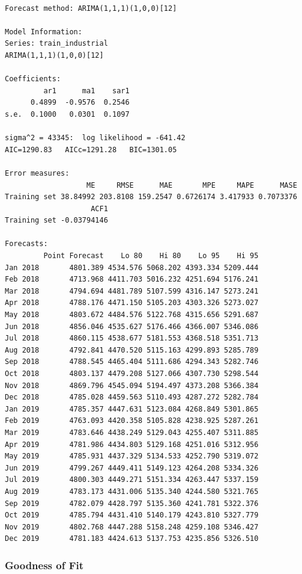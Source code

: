 \documentclass[
  letterpaper,
  DIV=11,
  numbers=noendperiod]{scrartcl}
\begin{document}
\begin{verbatim}

Forecast method: ARIMA(1,1,1)(1,0,0)[12]

Model Information:
Series: train_industrial 
ARIMA(1,1,1)(1,0,0)[12] 

Coefficients:
         ar1      ma1    sar1
      0.4899  -0.9576  0.2546
s.e.  0.1000   0.0301  0.1097

sigma^2 = 43345:  log likelihood = -641.42
AIC=1290.83   AICc=1291.28   BIC=1301.05

Error measures:
                   ME     RMSE      MAE       MPE     MAPE      MASE
Training set 38.84992 203.8108 159.2547 0.6726174 3.417933 0.7073376
                    ACF1
Training set -0.03794146

Forecasts:
         Point Forecast    Lo 80    Hi 80    Lo 95    Hi 95
Jan 2018       4801.389 4534.576 5068.202 4393.334 5209.444
Feb 2018       4713.968 4411.703 5016.232 4251.694 5176.241
Mar 2018       4794.694 4481.789 5107.599 4316.147 5273.241
Apr 2018       4788.176 4471.150 5105.203 4303.326 5273.027
May 2018       4803.672 4484.576 5122.768 4315.656 5291.687
Jun 2018       4856.046 4535.627 5176.466 4366.007 5346.086
Jul 2018       4860.115 4538.677 5181.553 4368.518 5351.713
Aug 2018       4792.841 4470.520 5115.163 4299.893 5285.789
Sep 2018       4788.545 4465.404 5111.686 4294.343 5282.746
Oct 2018       4803.137 4479.208 5127.066 4307.730 5298.544
Nov 2018       4869.796 4545.094 5194.497 4373.208 5366.384
Dec 2018       4785.028 4459.563 5110.493 4287.272 5282.784
Jan 2019       4785.357 4447.631 5123.084 4268.849 5301.865
Feb 2019       4763.093 4420.358 5105.828 4238.925 5287.261
Mar 2019       4783.646 4438.249 5129.043 4255.407 5311.885
Apr 2019       4781.986 4434.803 5129.168 4251.016 5312.956
May 2019       4785.931 4437.329 5134.533 4252.790 5319.072
Jun 2019       4799.267 4449.411 5149.123 4264.208 5334.326
Jul 2019       4800.303 4449.271 5151.334 4263.447 5337.159
Aug 2019       4783.173 4431.006 5135.340 4244.580 5321.765
Sep 2019       4782.079 4428.797 5135.360 4241.781 5322.376
Oct 2019       4785.794 4431.410 5140.179 4243.810 5327.779
Nov 2019       4802.768 4447.288 5158.248 4259.108 5346.427
Dec 2019       4781.183 4424.613 5137.753 4235.856 5326.510
\end{verbatim}

\subsubsection{Goodness of Fit}\label{goodness-of-fit}
\end{document}
